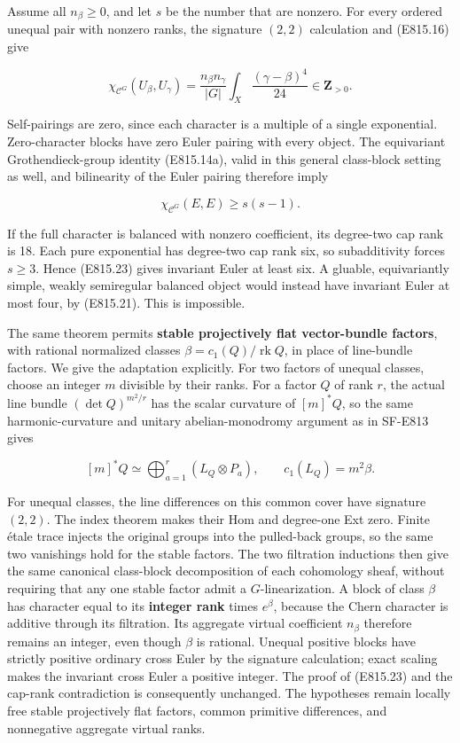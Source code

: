 Assume all \(n_\beta\ge0\), and let \(s\) be the number that are
nonzero. For every ordered unequal pair with nonzero ranks, the
signature \((2,2)\) calculation and (E815.16) give

\[
 \chi_{\mathcal C^G}(U_\beta,U_\gamma)
  =\frac{n_\beta n_\gamma}{|G|}
       \int_X\frac{(\gamma-\beta)^4}{24}
  \in\mathbf Z_{>0}.
\]

Self-pairings are zero, since each character is a multiple of a single
exponential. Zero-character blocks have zero Euler pairing with every
object. The equivariant Grothendieck-group identity (E815.14a), valid in
this general class-block setting as well, and bilinearity of the Euler
pairing therefore imply

\[
 \chi_{\mathcal C^G}(E,E)\ge s(s-1).
 \tag{E815.23}
\]

If the full character is balanced with nonzero coefficient, its
degree-two cap rank is 18. Each pure exponential has degree-two cap rank
six, so subadditivity forces \(s\ge3\). Hence (E815.23) gives invariant
Euler at least six. A gluable, equivariantly simple, weakly semiregular
balanced object would instead have invariant Euler at most four, by
(E815.21). This is impossible.

The same theorem permits \textbf{stable projectively flat vector-bundle
factors}, with rational normalized classes
\(\beta=c_1(Q)/\operatorname{rk}Q\), in place of line-bundle factors. We
give the adaptation explicitly. For two factors of unequal classes,
choose an integer \(m\) divisible by their ranks. For a factor \(Q\) of
rank \(r\), the actual line bundle \((\det Q)^{m^2/r}\) has the scalar
curvature of \([m]^*Q\), so the same harmonic-curvature and unitary
abelian-monodromy argument as in SF-E813 gives

\[
 [m]^*Q\simeq
 \bigoplus_{a=1}^{r}(L_Q\otimes P_a),
 \qquad c_1(L_Q)=m^2\beta.
 \tag{E815.24}
\]

For unequal classes, the line differences on this common cover have
signature \((2,2)\). The index theorem makes their Hom and degree-one
Ext zero. Finite étale trace injects the original groups into the
pulled-back groups, so the same two vanishings hold for the stable
factors. The two filtration inductions then give the same canonical
class-block decomposition of each cohomology sheaf, without requiring
that any one stable factor admit a \(G\)-linearization. A block of class
\(\beta\) has character equal to its \textbf{integer rank} times
\(e^\beta\), because the Chern character is additive through its
filtration. Its aggregate virtual coefficient \(n_\beta\) therefore
remains an integer, even though \(\beta\) is rational. Unequal positive
blocks have strictly positive ordinary cross Euler by the signature
calculation; exact scaling makes the invariant cross Euler a positive
integer. The proof of (E815.23) and the cap-rank contradiction is
consequently unchanged. The hypotheses remain locally free stable
projectively flat factors, common primitive differences, and nonnegative
aggregate virtual ranks.

